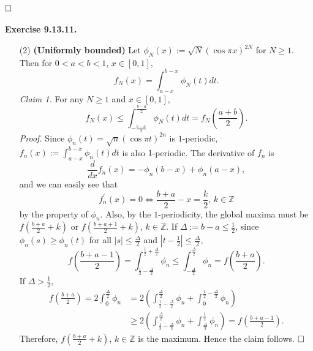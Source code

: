 \documentclass[12pt]{extarticle}
\begin{document}
$\hspace{\fill}\square$
\\
\\
\textbf{Exercise 9.13.11.}
\begin{enumerate}
\item[(2)] \textbf{(Uniformly bounded)} Let $\phi_N(x):=\sqrt{N}(\cos\pi x)^{2N}$ for $N\geq 1$. Then for $0<a<b<1$, $x\in[0,1]$,
\[
f_N(x)=\int_{a-x}^{b-x}\phi_N(t)dt.
\]
\textit{Claim 1.} For any $N\geq 1$ and $x\in[0,1]$,
\[
f_N(x)\leq\int_{-\frac{b-a}{2}}^\frac{b-a}{2}\phi_N(t)dt=f_N\left(\frac{a+b}{2}\right).
\]
\textit{Proof.} Since $\phi_n(t)=\sqrt{n}(\cos\pi t)^{2n}$ is $1$-periodic, $f_n(x):=\int_{a-x}^{b-x}\phi_n(t)dt$ is also $1$-periodic. The derivative of $f_n$ is
\[
\frac{d}{dx}f_n(x)=-\phi_n(b-x)+\phi_n(a-x),
\]
and we can easily see that
\[
f_n^\prime(x)=0\Leftrightarrow
\frac{b+a}{2}-x=\frac{k}{2},\,k\in\mathbb{Z}
\]
by the property of $\phi_n$. Also, by the $1$-periodicity, the global maxima must be $f(\frac{b+a}{2}+k)$ or $f(\frac{b+a+1}{2}+k)$, $k\in\mathbb{Z}$. If $\Delta:=b-a\leq\frac{1}{2}$, since $\phi_n(s)\geq\phi_n(t)$ for all $|s|\leq\frac{\Delta}{2}$ and $|t-\frac{1}{2}|\leq\frac{\Delta}{2}$, 
\[
f\left(\frac{b+a-1}{2}\right)=\int_{\frac{1}{2}-\frac{\Delta}{2}}^{\frac{1}{2}+\frac{\Delta}{2}}\phi_n\leq\int_{-\frac{\Delta}{2}}^\frac{\Delta}{2}\phi_n
=f\left(\frac{b+a}{2}\right).
\]
If $\Delta>\frac{1}{2}$,
\[
\begin{aligned}
f\left(\frac{b+a}{2}\right)
=2\int_0^\frac{\Delta}{2}\phi_n
&=2\left(\int_{\frac{1}{2}-\frac{\Delta}{2}}^\frac{\Delta}{2}\phi_n+\int_0^{\frac{1}{2}-\frac{\Delta}{2}}\phi_n\right)
\\&
\geq 2\left(\int_{\frac{1}{2}-\frac{\Delta}{2}}^\frac{\Delta}{2}\phi_n+\int_\frac{\Delta}{2}^\frac{1}{2}\phi_n\right)
=f\left(\frac{b+a-1}{2}\right).
\end{aligned}
\]
Therefore, $f(\frac{b+a}{2}+k)$, $k\in\mathbb{Z}$ is the maximum. Hence the claim follows.
$\hspace{\fill}\square$\\


\end{enumerate}
\end{document}
